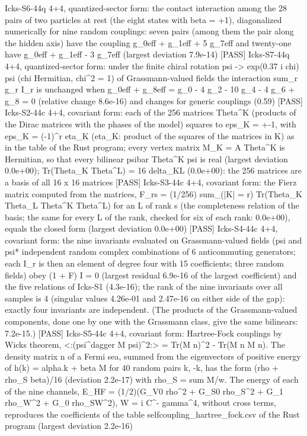 \documentclass[
  10pt,
]{article}
\newenvironment{Shaded}{}{}
\newcommand{\NormalTok}[1]{#1}
\begin{document}
\begin{Shaded}
\begin{Highlighting}[]
\NormalTok{[PASS] Icks{-}S6{-}44q  4+4, quantized{-}sector form: the contact interaction among the 28 pairs of two particles at rest (the eight states with beta = +1), diagonalized numerically for nine random couplings: seven pairs (among them the pair along the hidden axis) have the coupling g\_0eff + g\_1eff + 5 g\_7eff and twenty{-}one have g\_0eff + g\_1eff {-} 3 g\_7eff (largest deviation 7.9e{-}14)}
\NormalTok{[PASS] Icks{-}S7{-}44q  4+4, quantized{-}sector form: under the finite chiral rotation psi {-}\textgreater{} exp(0.37 i chi) psi (chi Hermitian, chi\^{}2 = 1) of Grassmann{-}valued fields the interaction sum\_r g\_r I\_r is unchanged when g\_0eff + g\_8eff = g\_0 {-} 4 g\_2 {-} 10 g\_4 {-} 4 g\_6 + g\_8 = 0 (relative change 8.6e{-}16) and changes for generic couplings (0.59)}
\NormalTok{[PASS] Icks{-}S2{-}44c  4+4, covariant form: each of the 256 matrices Theta\^{}K (products of the Dirac matrices with the phases of the model) squares to eps\_K = +{-}1, with eps\_K = ({-}1)\^{}r eta\_K (eta\_K: product of the squares of the matrices in K) as in the table of the Rust program; every vertex matrix M\_K = A Theta\^{}K is Hermitian, so that every bilinear psibar Theta\^{}K psi is real (largest deviation 0.0e+00); Tr(Theta\_K Theta\^{}L) = 16 delta\_KL (0.0e+00): the 256 matrices are a basis of all 16 x 16 matrices}
\NormalTok{[PASS] Icks{-}S3{-}44c  4+4, covariant form: the Fierz matrix computed from the matrices, F\_rs = (1/256) sum\_(|K| = r) Tr(Theta\_K Theta\_L Theta\^{}K Theta\^{}L) for an L of rank s (the completeness relation of the basis; the same for every L of the rank, checked for six of each rank: 0.0e+00), equals the closed form (largest deviation 0.0e+00)}
\NormalTok{[PASS] Icks{-}S4{-}44c  4+4, covariant form: the nine invariants evaluated on Grassmann{-}valued fields (psi and psi* independent random complex combinations of 6 anticommuting generators; each I\_r is then an element of degree four with 15 coefficients; three random fields) obey (1 + F) I = 0 (largest residual 6.9e{-}16 of the largest coefficient) and the five relations of Icks{-}S1 (4.3e{-}16); the rank of the nine invariants over all samples is 4 (singular values 4.26e{-}01 and 2.47e{-}16 on either side of the gap): exactly four invariants are independent. (The products of the Grassmann{-}valued components, done one by one with the Grassmann class, give the same bilinears: 7.2e{-}15.)}
\NormalTok{[PASS] Icks{-}S5{-}44c  4+4, covariant form: Hartree{-}Fock couplings by Wick\textquotesingle{}s theorem, \textless{}:(psi\^{}dagger M psi)\^{}2:\textgreater{} = Tr(M n)\^{}2 {-} Tr(M n M n). The density matrix n of a Fermi sea, summed from the eigenvectors of positive energy of h(k) = alpha.k + beta M for 40 random pairs k, {-}k, has the form (rho + rho\_S beta)/16 (deviation 2.2e{-}17) with rho\_S = sum M/w. The energy of each of the nine channels, E\_HF = (1/2)(G\_V0 rho\^{}2 + G\_S0 rho\_S\^{}2 + G\_1 rho\_W\^{}2 + G\_0 rho\_SW\^{}2), W = i C\^{}{-} gamma\^{}4, without cross terms, reproduces the coefficients of the table selfcoupling\_hartree\_fock.csv of the Rust program (largest deviation 2.2e{-}16)}

\end{Highlighting}
\end{Shaded}
\end{document}
